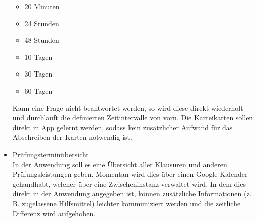 \begin{itemize}
        \begin{itemize}
        	\item 20 Minuten
        	\item 24 Stunden
        	\item 48 Stunden
        	\item 10 Tagen
        	\item 30 Tagen
        	\item 60 Tagen
        \end{itemize}  
    	Kann eine Frage nicht beantwortet werden, so wird diese direkt wiederholt und durchläuft die definierten Zeitintervalle von vorn. %
        Die Karteikarten sollen direkt in App gelernt werden, sodass kein zusätzlicher Aufwand für das Abschreiben der Karten notwendig ist.

    \item Prüfungsterminübersicht           \\
        In der Anwendung soll es eine Übersicht aller Klausuren und anderen Prüfungsleistungen geben.
        Momentan wird dies über einen Google Kalender gehandhabt, welcher über eine Zwischeninstanz verwaltet wird.
        In dem dies direkt in der Anwendung angegeben ist, können zusätzliche Informationen (z.\,B. zugelassene Hilfsmittel) leichter kommuniziert werden und die zeitliche Differenz wird aufgehoben.


\end{itemize}
